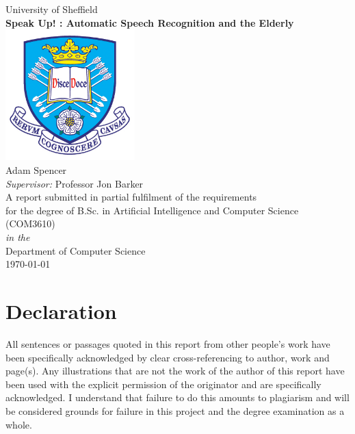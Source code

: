 \documentclass[11pt,oneside]{book}
\begin{document}
\frontmatter

\begin{titlepage}


\begin{center}
{\LARGE University of Sheffield}\\[1.5cm]
\linespread{1.2}\huge {\bfseries Speak Up! : Automatic Speech Recognition and the Elderly}\\[1.5cm]
\linespread{1}
\includegraphics[width=5cm]{images/tuoslogo}\\[1cm]
{\Large Adam Spencer}\\[1cm]
{\large \emph{Supervisor:} Professor Jon Barker}\\[1cm]
\large A report submitted in partial fulfilment of the requirements\\ for the degree of B.Sc. in
Artificial Intelligence and Computer Science\\ (COM3610)\\[0.3cm]
\textit{in the}\\[0.3cm]
Department of Computer Science\\[2cm]
\today
\end{center}

\end{titlepage}


\newpage
\chapter*{\Large Declaration}


All sentences or passages quoted in this report from other people's work have been specifically
acknowledged by clear cross-referencing to author, work and page(s).
Any illustrations that are not the work of the author of this report have been used with the
explicit permission of the originator and are specifically acknowledged.
I understand that failure to do this amounts to plagiarism and will be considered grounds for
failure in this project and the degree examination as a whole.\\[1cm]
\end{document}
